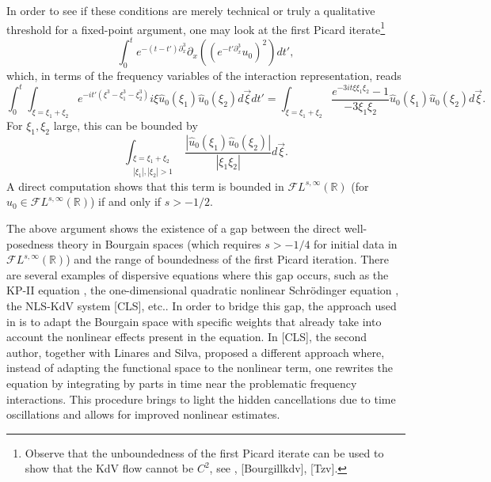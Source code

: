 \documentclass[%
11pt,  reqno]{amsart}
\newcommand{\5}{\textup{V}}
\DeclareMathOperator*{\intt}{\int}
\newcommand{\dx}{\partial_x}
\theoremstyle{remark}
\newcommand{\R}{\mathbb{R}}
\numberwithin{equation}{section}
\numberwithin{theorem}{section}
\begin{document}
	\medskip
	In order to see if these conditions are merely technical or truly a qualitative threshold for a fixed-point argument, one may look at the first Picard iterate\footnote{Observe that the unboundedness of the first Picard iterate can be used to show that the KdV flow cannot be $C^2$, see  \cite{taobejenaru}, [Bourgillkdv], [Tzv].}
	$$
	\int_0^t e^{-(t-t')\dx^3}\partial_x((e^{-t'\dx^3}u_0)^2)dt',
	$$
	which, in terms of the frequency variables of the interaction representation, reads
	\begin{equation}\label{eq:first_picard}
		\int_0^t \intt_{\xi=\xi_1+\xi_2}e^{-it' (\xi^3 -
			\xi_1^3 - \xi_2^3) } i\xi \widehat{u}_0( \xi_1) \widehat{u}_0(\xi_2) d\vec{\xi} dt' = \intt_{\xi=\xi_1+\xi_2}\frac{e^{-3it\xi\xi_1\xi_2}-1}{-3\xi_1\xi_2} \widehat{u}_0( \xi_1) \widehat{u}_0(\xi_2) d\vec{\xi}.
	\end{equation}
	For $\xi_1, \xi_2$ large, this can be bounded by
	\begin{equation}
		\intt_{\substack{\xi=\xi_1+\xi_2\\|\xi_1|, |\xi_2|>1}}\frac{|\widehat{u}_0( \xi_1) \widehat{u}_0(\xi_2)|}{|\xi_1\xi_2|}  d\vec{\xi}.
	\end{equation}
	A direct computation shows that this term is bounded in $\mathcal{F}L^{s,\infty}(\R)$ (for $u_0\in \mathcal{F}L^{s,\infty}(\R)$) if and only if $s>-1/2$.
	
	\medskip
	The above argument shows the existence of a gap between the direct well-posedness theory in Bourgain spaces (which   requires $s>-1/4$ for initial data in $\mathcal{F}L^{s,\infty}(\R)$) and the range of boundedness of the first Picard iteration. There are several examples of dispersive equations where this gap occurs, such as the KP-II equation \cite{hadac, HHK_kpii}, the one-dimensional quadratic nonlinear Schrödinger equation \cite{OS12,taobejenaru}, the NLS-KdV system [CLS], etc.. In order to bridge this gap, the approach used in \cite{hadac, HHK_kpii, taobejenaru} is to adapt the Bourgain space with specific weights that already take into account the nonlinear effects present in the equation. In [CLS], the second author, together with Linares and Silva, proposed a different approach where, instead of adapting the functional space to the nonlinear term, one rewrites the equation by integrating by parts in time near the problematic frequency interactions. This procedure brings to light the hidden cancellations due to time oscillations and allows for improved nonlinear estimates. 
	
\end{document}
